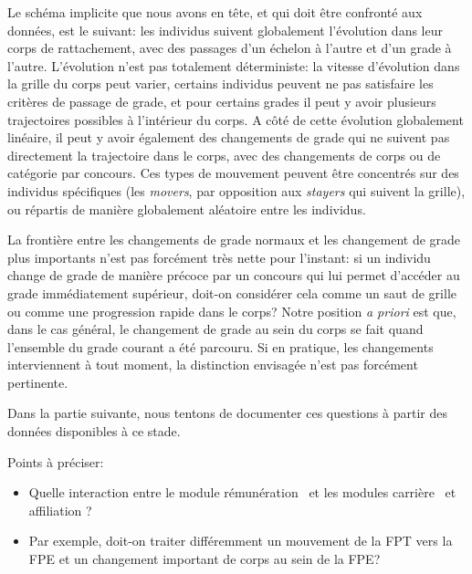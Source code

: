\documentclass[11pt,a4paper]{article}
\begin{document}
Le schéma implicite que nous avons en tête, et qui doit être confronté aux données, est le suivant: les individus suivent globalement l'évolution dans leur corps de rattachement, avec des passages d'un échelon à l'autre et d'un grade à l'autre. L'évolution n'est pas totalement déterministe: la vitesse d'évolution dans la grille du corps peut varier, certains individus peuvent ne pas satisfaire les critères de passage de grade, et pour certains grades il peut y avoir plusieurs trajectoires possibles à l'intérieur du corps. A côté de cette évolution globalement linéaire, il peut y avoir également des changements de grade qui ne suivent pas directement la trajectoire dans le corps, avec des changements de corps ou de catégorie par concours. Ces types de mouvement peuvent être concentrés sur des individus spécifiques (les \textit{movers}, par opposition aux \textit{stayers} qui suivent la grille), ou répartis de manière globalement aléatoire entre les individus. 

La frontière entre les changements de grade \og normaux \fg{}  et les changement de grade plus importants n'est pas forcément très nette pour l'instant: si un individu change de grade de manière précoce par un concours qui lui permet d'accéder au grade immédiatement supérieur, doit-on considérer cela comme un saut de grille ou comme une progression rapide dans le corps? Notre position \textit{a priori} est que, dans le cas général, le changement de grade au sein du corps se fait quand l'ensemble du grade courant a été parcouru. Si en pratique, les changements interviennent à tout moment, la distinction envisagée n'est pas forcément pertinente.


Dans la partie suivante, nous tentons de documenter ces questions à partir des données disponibles à ce stade. 


\vspace{0.5cm}
Points à préciser: 
\begin{itemize}[leftmargin=1cm ,parsep=0cm,itemsep=0cm,topsep=0cm] 
    \item Quelle interaction entre le module \og rémunération \fg\ et les modules \og carrière \fg\ et \og affiliation \fg ?   
    \item[] Par exemple, doit-on traiter différemment un mouvement de la FPT vers la FPE et un changement important de corps au sein de la FPE? 
\end{itemize}



\ifx\isEmbedded\undefined
\newpage
 

\end{document}
